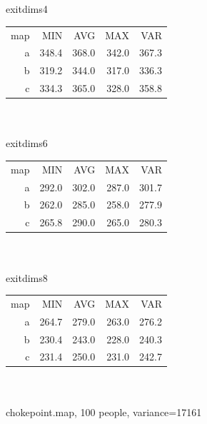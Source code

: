 \documentclass[12pt,letterpaper]{article}
\begin{document}
\\
\\
exitdims4
\begin{tabular}{ r | r | r | r | r }
map & MIN   & AVG   & MAX   & VAR   \\
a   & 348.4 & 368.0 & 342.0 & 367.3 \\
b   & 319.2 & 344.0 & 317.0 & 336.3 \\
c   & 334.3 & 365.0 & 328.0 & 358.8 \\
\end{tabular}
\\
\\
exitdims6
\begin{tabular}{ r | r | r | r | r }
map & MIN   & AVG   & MAX   & VAR   \\
a   & 292.0 & 302.0 & 287.0 & 301.7 \\    
b   & 262.0 & 285.0 & 258.0 & 277.9 \\
c   & 265.8 & 290.0 & 265.0 & 280.3 \\
\end{tabular}
\\
\\
exitdims8
\begin{tabular}{ r | r | r | r | r }
map &  MIN   &  AVG  & MAX   & VAR   \\
a   &  264.7 & 279.0 & 263.0 & 276.2 \\
b   &  230.4 & 243.0 & 228.0 & 240.3 \\
c   &  231.4 & 250.0 & 231.0 & 242.7 \\
\end{tabular}  
\\
\\
chokepoint.map, 100 people, variance=17161
\end{document}
